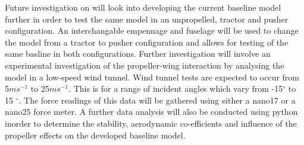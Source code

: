 Future investigation on will look into developing the current baseline model further in order to test the same model in an unpropelled, tractor and pusher configuration. An interchangable empennage and fuselage will be used to change the model from a tractor to pusher configuration and allows for testing of the same basline in both configurations. Further investigation will involve an experimental investigation of the propeller-wing interaction by analysing the model in a low-speed wind tunnel. Wind tunnel tests are expected to occur from 5$ms^{-1}$ to 25$ms^{-1}$. This is for a range of incident angles which vary from -15$^\circ$ to 15 $^\circ$. The force readings of this data will be gathered using either a nano17 or a nano25 force meter. A further data analysis will also be conducted using python inorder to determine the stability, aerodynamic co-efficients and influence of the propeller effects on the developed baseline model. 

